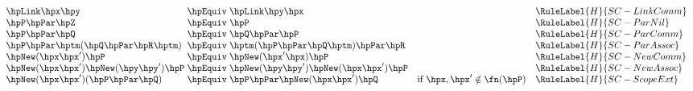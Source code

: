 $\displaystyle
  \begin{array}{l@{\;}c@{\;}lll}
    \hpLink\hpx\hpy
     & \hpEquiv
     & \hpLink\hpy\hpx
     &
     & \RuleLabel{H}{SC-LinkComm}
    \\
    \hpP\hpPar\hpZ
     & \hpEquiv
     & \hpP
     &
     & \RuleLabel{H}{SC-ParNil}
    \\
    \hpP\hpPar\hpQ
     & \hpEquiv
     & \hpQ\hpPar\hpP
     &
     & \RuleLabel{H}{SC-ParComm}
    \\
    \hpP\hpPar\hptm(\hpQ\hpPar\hpR\hptm)
     & \hpEquiv
     & \hptm(\hpP\hpPar\hpQ\hptm)\hpPar\hpR
     &
     & \RuleLabel{H}{SC-ParAssoc}
    \\
    \hpNew(\hpx\hpx')\hpP
     & \hpEquiv
     & \hpNew(\hpx'\hpx)\hpP
     &
     & \RuleLabel{H}{SC-NewComm}
    \\
    \hpNew(\hpx\hpx')\hpNew(\hpy\hpy')\hpP
     & \hpEquiv
     & \hpNew(\hpy\hpy')\hpNew(\hpx\hpx')\hpP
     &
     & \RuleLabel{H}{SC-NewAssoc}
    \\
    \hpNew(\hpx\hpx')(\hpP\hpPar\hpQ)
     & \hpEquiv
     & \hpP\hpPar\hpNew(\hpx\hpx')\hpQ
     & \text{if }\hpx,\hpx'\notin\fn(\hpP)
     & \RuleLabel{H}{SC-ScopeExt}
  \end{array}
$
